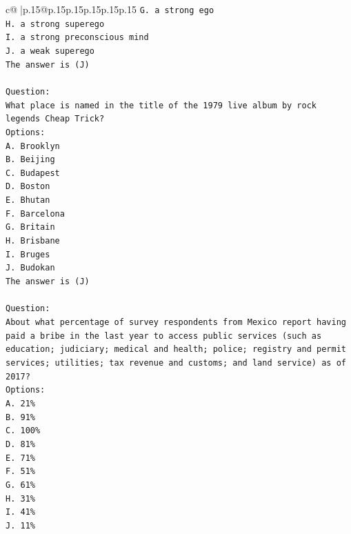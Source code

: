 \documentclass{article}
\begin{document}
{\begin{supertabular}{c@{$\;$}|p{.15\linewidth}@{}p{.15\linewidth}p{.15\linewidth}p{.15\linewidth}p{.15\linewidth}p{.15\linewidth}}
{{{\texttt{G. a strong ego} \\
\texttt{H. a strong superego} \\
\texttt{I. a strong preconscious mind} \\
\texttt{J. a weak superego} \\
\texttt{The answer is (J)} \\
\\ 
\texttt{Question:} \\
\texttt{What place is named in the title of the 1979 live album by rock legends Cheap Trick?} \\
\texttt{Options:} \\
\texttt{A. Brooklyn} \\
\texttt{B. Beijing} \\
\texttt{C. Budapest} \\
\texttt{D. Boston} \\
\texttt{E. Bhutan} \\
\texttt{F. Barcelona} \\
\texttt{G. Britain} \\
\texttt{H. Brisbane} \\
\texttt{I. Bruges} \\
\texttt{J. Budokan} \\
\texttt{The answer is (J)} \\
\\ 
\texttt{Question:} \\
\texttt{About what percentage of survey respondents from Mexico report having paid a bribe in the last year to access public services (such as education; judiciary; medical and health; police; registry and permit services; utilities; tax revenue and customs; and land service) as of 2017?} \\
\texttt{Options:} \\
\texttt{A. 21\%} \\
\texttt{B. 91\%} \\
\texttt{C. 100\%} \\
\texttt{D. 81\%} \\
\texttt{E. 71\%} \\
\texttt{F. 51\%} \\
\texttt{G. 61\%} \\
\texttt{H. 31\%} \\
\texttt{I. 41\%} \\
\texttt{J. 11\%} \\
            }
        }
    }
     \\ \\


\end{supertabular}}
\end{document}
